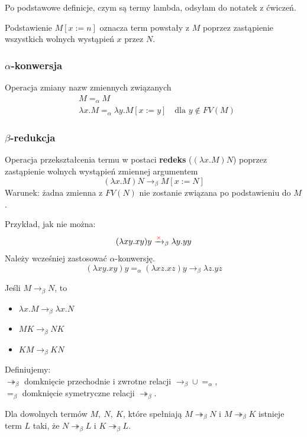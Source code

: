 Po podstawowe definicje, czym są termy lambda, odsyłam do notatek z ćwiczeń.

Podstawienie \( M[x := n] \) oznacza term powstały z \( M \) poprzez zastąpienie wszystkich wolnych wystąpień \( x \) przez \( N \).

\subsubsection*{\( \alpha \)-konwersja}
Operacja zmiany nazw zmiennych związanych
\begin{align*}
    & M =_{\alpha} M \\
    & \lambda x.M =_{\alpha} \lambda y.M[x := y] \quad \text{dla } y \notin FV(M)
\end{align*}

\subsubsection*{\( \beta \)-redukcja}
Operacja przekształcenia termu w postaci \textbf{redeks} (\((\lambda x.M)N\)) poprzez zastąpienie wolnych wystąpień zmiennej argumentem
\[ (\lambda x.M)N \rightarrow_{\beta} M[x := N] \]
Warunek: żadna zmienna z \( FV(N) \) nie zostanie związana po podstawieniu do \( M \).

Przykład, jak nie można:
\[ (\lambda xy.xy)y \xrightarrow[]{{\color{red} \times}}_{\beta} \lambda y.yy \]
Należy wcześniej zastosować \( \alpha \)-konwersję.
\[ (\lambda xy.xy)y =_{\alpha} (\lambda xz.xz)y \rightarrow_{\beta} \lambda z.yz \]

Jeśli \( M \rightarrow_{\beta} N \), to
\begin{itemize}
    \item \( \lambda x.M \rightarrow_{\beta} \lambda x.N \)
    \item \( MK \rightarrow_{\beta} NK \)
    \item \( KM \rightarrow_{\beta} KN \)
\end{itemize}

Definiujemy: \\
\( \twoheadrightarrow_{\beta} \) domknięcie przechodnie i zwrotne relacji \( \rightarrow_{\beta} \cup =_{\alpha} \), \\
\( =_{\beta} \) domknięcie symetryczne relacji \( \twoheadrightarrow_{\beta} \).

\begin{theorem}
    Dla dowolnych termów \( M, \ N, \ K \), które spełniają \( M \twoheadrightarrow_{\beta} N \) i \( M \twoheadrightarrow_{\beta} K \) istnieje term \( L \) taki, że \( N \twoheadrightarrow_{\beta} L \) i \( K \twoheadrightarrow_{\beta} L \).
    \begin{center}
        
    \end{center}
\end{theorem}

